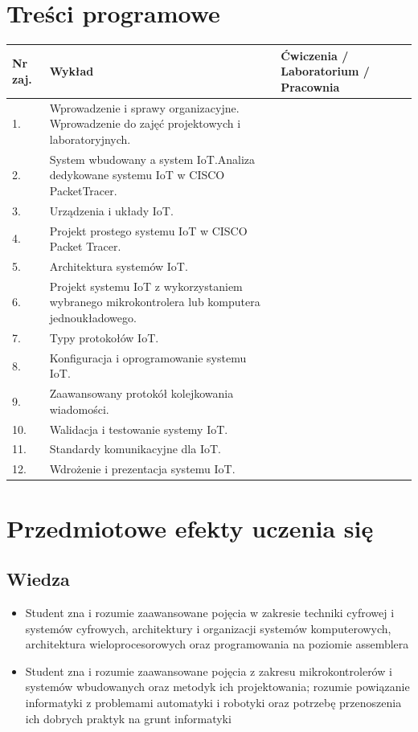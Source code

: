 \documentclass[12pt, a4paper]{article}
\begin{document}
\section{Treści programowe}

\begin{longtable}{|p{1.5cm}|p{6.5cm}|p{6.5cm}|}
\hline
\textbf{Nr zaj.} & \textbf{Wykład} & \textbf{Ćwiczenia / Laboratorium / Pracownia} \\\hline
\endhead
  \hline
  1. & Wprowadzenie i sprawy organizacyjne. Wprowadzenie do zajęć projektowych i laboratoryjnych. &  \\
  \hline
  2. & System wbudowany a system IoT.Analiza dedykowane systemu IoT w  CISCO PacketTracer. &  \\
  \hline
  3. & Urządzenia i układy IoT. &  \\
  \hline
  4. & Projekt prostego systemu IoT w CISCO Packet Tracer. &  \\
  \hline
  5. & Architektura systemów IoT. &  \\
  \hline
  6. & Projekt systemu IoT z wykorzystaniem wybranego mikrokontrolera lub komputera jednoukładowego. &  \\
  \hline
  7. & Typy protokołów IoT. &  \\
  \hline
  8. & Konfiguracja i oprogramowanie systemu IoT. &  \\
  \hline
  9. & Zaawansowany protokół kolejkowania wiadomości. &  \\
  \hline
  10. & Walidacja i testowanie systemy IoT. &  \\
  \hline
  11. & Standardy komunikacyjne dla IoT. &  \\
  \hline
  12. & Wdrożenie i prezentacja systemu IoT. &  \\
  \hline
\end{longtable}

\section{Przedmiotowe efekty uczenia się}

\subsection*{Wiedza}
\begin{itemize}
  \item Student zna i rozumie zaawansowane pojęcia w zakresie techniki cyfrowej i systemów cyfrowych, architektury i organizacji systemów komputerowych, architektura wieloprocesorowych oraz programowania na poziomie assemblera
  \item Student zna i rozumie zaawansowane pojęcia z zakresu mikrokontrolerów i systemów wbudowanych oraz metodyk ich projektowania; rozumie powiązanie informatyki z problemami automatyki i robotyki oraz potrzebę przenoszenia ich dobrych praktyk na grunt informatyki
\end{itemize}
\end{document}
